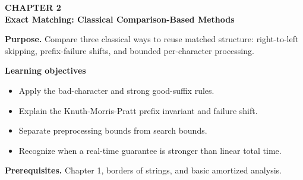 \documentclass[11pt]{article}
\begin{document}
\begin{tcolorbox}[
  enhanced,breakable,colback=Primary!4,colframe=Primary,boxrule=0.9pt,
  arc=2mm,left=3mm,right=3mm,top=2.5mm,bottom=2.5mm]
{\sffamily\color{Accent}\bfseries CHAPTER 2}\\[-1pt]
{\sffamily\LARGE\bfseries\color{Primary} Exact Matching: Classical Comparison-Based Methods}

\vspace{2pt}
\textbf{Purpose.} Compare three classical ways to reuse matched structure: right-to-left skipping, prefix-failure shifts, and bounded per-character processing.

\textbf{Learning objectives}
\begin{itemize}
  \item Apply the bad-character and strong good-suffix rules.
  \item Explain the Knuth-Morris-Pratt prefix invariant and failure shift.
  \item Separate preprocessing bounds from search bounds.
  \item Recognize when a real-time guarantee is stronger than linear total time.
\end{itemize}

\textbf{Prerequisites.} Chapter 1, borders of strings, and basic amortized analysis.
\end{tcolorbox}
\end{document}
